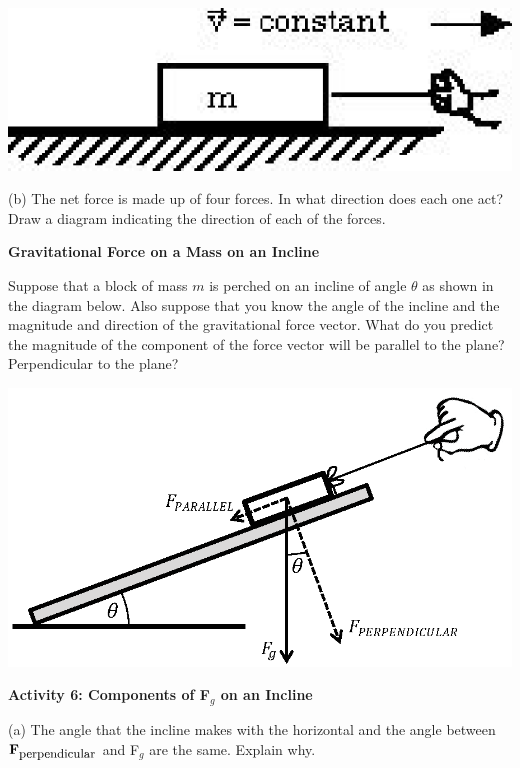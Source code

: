 \vspace{0.3cm}
{\par\raggedright \includegraphics{newton/newton_fig9.eps} \par}
\vspace{0.3cm}

(b) The net force is made up of four forces.  
In what direction does each one act? Draw a
diagram indicating the direction of each of the forces.
\vspace{30mm}

\textbf{Gravitational Force on a Mass on an Incline }

Suppose that a block of mass $m$ is perched on an incline of angle \( \theta  \)
as shown in the diagram below. Also suppose that you know the angle of the incline
and the magnitude and direction of the gravitational force vector. What do you
predict the magnitude of the component of the force vector will be parallel
to the plane? Perpendicular to the plane?

\vspace{0.3cm}
{\par\centering \includegraphics{newton/newton_fig10_new.eps} \par}
\vspace{0.3cm}

\textbf{Activity 6: Components of F\( _{g} \) on an Incline }

(a) The angle that the incline makes with the horizontal and the angle between
\( {\bf F}_{{\mbox{\small perpendicular}}} \) and F\( _{g} \) are the same. Explain why.
\vspace{20mm}

